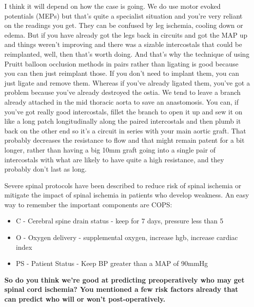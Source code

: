 \documentclass[
]{book}
\begin{document}
I think it will depend on how the case is going. We do use motor evoked
potentials (MEPs) but that's quite a specialist situation and you're
very reliant on the readings you get. They can be confused by leg
ischemia, cooling down or edema. But if you have already got the legs
back in circuits and got the MAP up and things weren't improving and
there was a sizable intercostals that could be reimplanted, well, then
that's worth doing. And that's why the technique of using Pruitt balloon
occlusion methods in pairs rather than ligating is good because you can
then just reimplant those. If you don't need to implant them, you can
just ligate and remove them. Whereas if you've already ligated them,
you've got a problem because you've already destroyed the ostia. We tend
to leave a branch already attached in the mid thoracic aorta to save an
anastomosis. You can, if you've got really good intercostals, fillet the
branch to open it up and sew it on like a long patch longitudinally
along the paired intercostals and then plumb it back on the other end so
it's a circuit in series with your main aortic graft. That probably
decreases the resistance to flow and that might remain patent for a bit
longer, rather than having a big 10mm graft going into a single pair of
intercostals with what are likely to have quite a high resistance, and
they probably don't last as long.

Severe spinal protocols have been described to reduce risk of spinal
ischemia or mitigate the impact of spinal ischemia in patients who
develop weakness.\citep{estrera2009, yanase2012} An easy way to remember the
important components are COPS:

\begin{itemize}
\item
  C - Cerebral spine drain status - keep for 7 days, pressure less
  than 5
\item
  O - Oxygen delivery - supplemental oxygen, increase hgb, increase
  cardiac index
\item
  PS - Patient Status - Keep BP greater than a MAP of 90mmHg
\end{itemize}

\textbf{So do you think we're good at predicting preoperatively who may get
spinal cord ischemia? You mentioned a few risk factors already that can
predict who will or won't post-operatively.}
\end{document}
